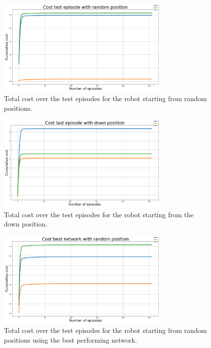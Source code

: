 \documentclass[twocolumn, a4paper]{article}
\begin{document}

\label{fig:Test_1_random_pos}
\begin{figure}[H]
	\centering
	\includegraphics[width=8.5cm]{"../Figures/loss_last_ep_random_positions_1J_500E_256EL.png"}
	\caption{Total cost over the test episodes for the robot starting
			 from random positions.}
\end{figure}
\vspace{-1cm}
\label{fig:Test_1_down_pos}
\begin{figure}[H]
	\centering
	\includegraphics[width=8.5cm]{"../Figures/loss_last_ep_down_positions_1J_500E_256EL.png"}
	\caption{Total cost over the test episodes for the robot starting
			 from the down position.}
\end{figure}
\vspace{-1cm}
\label{fig:Test_1_best_random_pos}
\begin{figure}[H]
	\centering
	\includegraphics[width=8.5cm]{"../Figures/loss_best_net_random_positions_1J_500E_256EL.png"}
	\caption{Total cost over the test episodes for the robot starting from
			 random positions using the best performing network.}
\end{figure}
\end{document}
